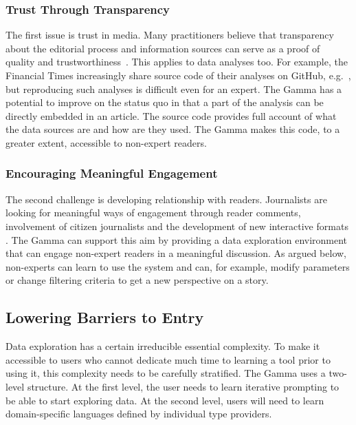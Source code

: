 \documentclass[manuscript,review,anonymous]{acmart}
\begin{document}
\subsubsection*{Trust Through Transparency}
The first issue is trust in media. Many practitioners believe that transparency
about the editorial process and information sources can serve as a proof of quality and
trustworthiness~\cite{transparency}. This applies to data analyses too. For example, the Financial Times
increasingly share source code of their analyses on GitHub, e.g.~\cite{ftnotebooks},
but reproducing such analyses is difficult even for an expert. The Gamma has a potential to
improve on the status quo in that a part of the analysis can be directly embedded in an article.
The source code provides full account of what the data sources are and how are they used.
The Gamma makes this code, to a greater extent, accessible to non-expert readers.

\subsubsection*{Encouraging Meaningful Engagement}

The second challenge is developing relationship with readers. Journalists are looking
for meaningful ways of engagement through reader comments, involvement of citizen journalists
\cite{comments,citizen} and the development of new interactive formats \cite{youdraw}.
The Gamma can support this aim by providing a data exploration environment that can engage
non-expert readers in a meaningful discussion. As argued below, non-experts can learn to use the
system and can, for example, modify parameters or change filtering criteria to get a
new perspective on a story.

\subsection{Lowering Barriers to Entry}
\label{sec:design-bar}

Data exploration has a certain irreducible essential complexity. To make it accessible to users who
cannot dedicate much time to learning a tool prior to using it, this complexity needs to be
carefully stratified. The Gamma uses a two-level structure. At the first level, the user needs
to learn iterative prompting to be able to start exploring data. At the second level, users will
need to learn domain-specific languages defined by individual type providers.
\end{document}
